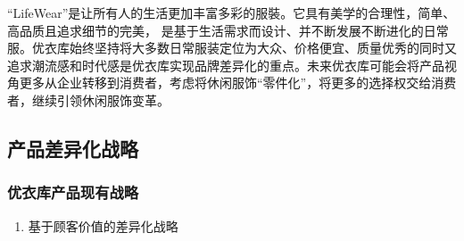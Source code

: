 \documentclass{xjtureport}
\begin{document}
\begin{itemize}
    “LifeWear”是让所有人的生活更加丰富多彩的服裝。它具有美学的合理性，简单、高品质且追求细节的完美， 是基于生活需求而设计、并不断发展不断进化的日常服。优衣库始终坚持将大多数日常服装定位为大众、价格便宜、质量优秀的同时又追求潮流感和时代感是优衣库实现品牌差异化的重点。未来优衣库可能会将产品视角更多从企业转移到消费者，考虑将休闲服饰“零件化”，将更多的选择权交给消费者，继续引领休闲服饰变革。
\end{itemize}
\subsection{产品差异化战略}
\subsubsection{优衣库产品现有战略}
\begin{enumerate}
    \item 基于顾客价值的差异化战略
    

\end{enumerate}
\end{document}
